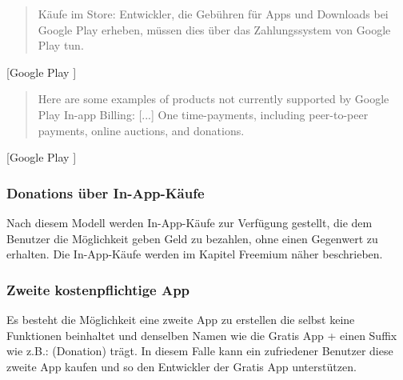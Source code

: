 \documentclass[FIPLY_base.tex]{subfiles}
\begin{document}
\begin{quote}
Käufe im Store: Entwickler, die Gebühren für Apps und Downloads bei Google Play erheben, müssen dies über das Zahlungssystem von Google Play tun.
\end{quote}[Google Play \cite{gpDevContentPolicy}]

\begin{quote}
Here are some examples of products not currently supported by Google Play In-app Billing: [...]
One time-payments, including peer-to-peer payments, online auctions, and donations.
\end{quote}[Google Play \cite{gpInAppBilling}]
\ \\
\subsubsection{Donations über In-App-Käufe}
Nach diesem Modell werden In-App-Käufe zur Verfügung gestellt, die dem Benutzer die Möglichkeit geben Geld zu bezahlen, ohne einen Gegenwert zu erhalten. 
Die In-App-Käufe werden im Kapitel Freemium näher beschrieben.
\ \\
\subsubsection{Zweite kostenpflichtige App}
Es besteht die Möglichkeit eine zweite App zu erstellen die selbst keine Funktionen beinhaltet und denselben Namen wie die Gratis App + einen Suffix wie z.B.: (Donation) trägt.
In diesem Falle kann ein zufriedener Benutzer diese zweite App kaufen und so den Entwickler der Gratis App unterstützen.
\end{document}
